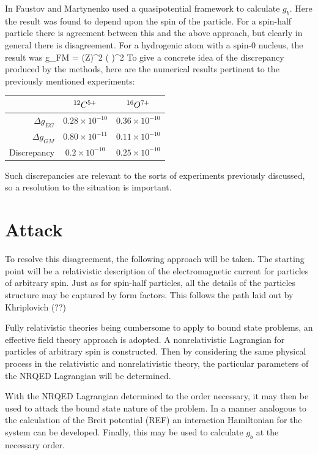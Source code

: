 In \cite{doi:10.1139/p02-112} Faustov and Martynenko used a quasipotential framework to calculate $g_b$.  Here the result was found to depend upon the spin of the particle.  For a spin-half particle there is agreement between this and the above approach, but clearly in general there is disagreement.   For a hydrogenic atom with a spin-0 nucleus, the result was
\beq
	\Delta g_{FM} =  (Z\alpha)^2 \left(  \right )^2
\eeq
To give a concrete idea of the discrepancy produced by the methods, here are the numerical results pertinent to the previously mentioned experiments:  
\begin{center}
\begin{tabular}{r c c}
 					&	$^{12}C^{5+}$						&	 $^{16}O^{7+}$	\\	\hline
 $\Delta g_{EG}$		&	$ 0.28 \times 10^{-10}$ 	&	$ 0.36 \times 10^{-10}$	\\
 $\Delta g_{GM}$		&	$ 0.80 \times 10^{-11}$		&	$ 0.11 \times 10^{-10}$	\\
 Discrepancy			&	$ 0.2 \times 10^{-10}$		&	$ 0.25\times 10^{-10}$	\\
\end{tabular}
\end{center}

Such discrepancies are relevant to the sorts of experiments previously discussed, so a resolution to the situation is important.

\section{Attack}

To resolve this disagreement, the following approach will be taken.  The starting point will be a relativistic description of the electromagnetic current for particles of arbitrary spin.  Just as for spin-half particles, all the details of the particles structure may be captured by form factors.  This follows the path laid out by Khriplovich (??) 

Fully relativistic theories being cumbersome to apply to bound state problems, an effective field theory approach is adopted.  A nonrelativistic Lagrangian for particles of arbitrary spin is constructed.  Then by considering the same physical process in the relativistic and nonrelativistic theory, the particular parameters of the NRQED Lagrangian will be determined.

With the NRQED Lagrangian determined to the order necessary, it may then be used to attack the bound state nature of the problem.  In a manner analogous to the calculation of the Breit potential (REF) an interaction Hamiltonian for the system can be developed.  Finally, this may be used to calculate $g_b$ at the necessary order.





